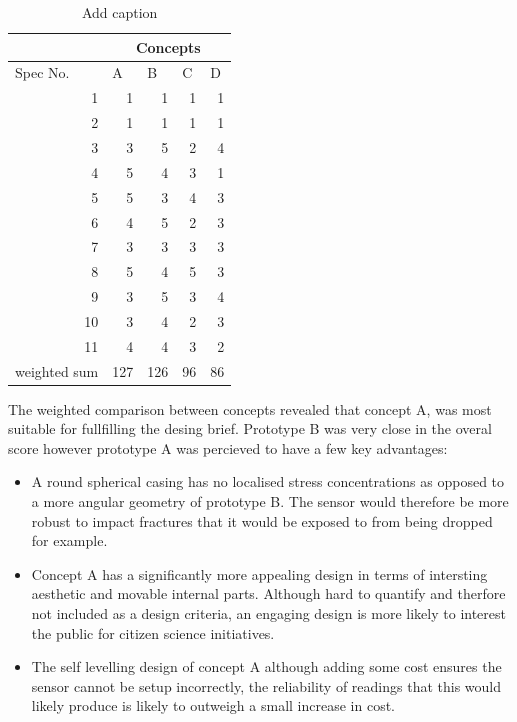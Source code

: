 \begin{table}[htbp]
  \centering
  \caption{Add caption}
    \begin{tabular}{lrrrr}
          & \multicolumn{4}{c}{Concepts} \\
\hline
    Spec No. & \multicolumn{1}{l}{A} & \multicolumn{1}{l}{B} & \multicolumn{1}{l}{C} & \multicolumn{1}{l}{D} \\
\hline
    \multicolumn{1}{r}{1} & 1     & 1     & 1     & 1 \\
    \multicolumn{1}{r}{2} & 1     & 1     & 1     & 1 \\
    \multicolumn{1}{r}{3} & 3     & 5     & 2     & 4 \\
    \multicolumn{1}{r}{4} & 5     & 4     & 3     & 1 \\
    \multicolumn{1}{r}{5} & 5     & 3     & 4     & 3 \\
    \multicolumn{1}{r}{6} & 4     & 5     & 2     & 3 \\
    \multicolumn{1}{r}{7} & 3     & 3     & 3     & 3 \\
    \multicolumn{1}{r}{8} & 5     & 4     & 5     & 3 \\
    \multicolumn{1}{r}{9} & 3     & 5     & 3     & 4 \\
    \multicolumn{1}{r}{10} & 3     & 4     & 2     & 3 \\
    \multicolumn{1}{r}{11} & 4     & 4     & 3     & 2 \\
    weighted sum & \cellcolor[rgb]{ .388,  .745,  .482}127 & \cellcolor[rgb]{ .427,  .757,  .486}126 & \cellcolor[rgb]{ .98,  .616,  .459}96 & \cellcolor[rgb]{ .973,  .412,  .42}86 \\
\hline
    \end{tabular}%
  \label{tab:addlabel}%
\end{table}%

The weighted comparison between concepts revealed that concept A, was most suitable for fullfilling the desing brief. Prototype B was very close in the overal score however prototype A was percieved to have a few key advantages:
\begin{itemize}
\item A round spherical casing has no localised stress concentrations as opposed to a more angular geometry of prototype B. The sensor would therefore be more robust to impact fractures that it would be exposed to from being dropped for example.
\item Concept A has a significantly more appealing design in terms of intersting aesthetic and movable internal parts. Although hard to quantify and therfore not included as a design criteria, an engaging design is more likely to interest the public for citizen science initiatives. 
\item The self levelling design of concept A although adding some cost ensures the sensor cannot be setup incorrectly, the reliability of readings that this would likely produce is likely to outweigh a small increase in cost.
\end{itemize}

